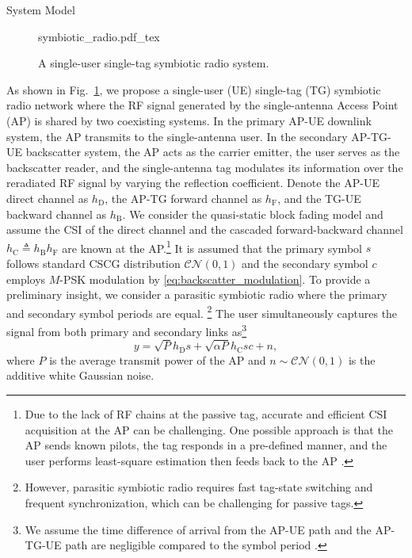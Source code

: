 \documentclass[journal]{IEEEtran}
\begin{document}
	\begin{section}{System Model}
		\begin{figure}[!t]
			\centering
			\def\svgwidth{0.9\columnwidth}
			{symbiotic_radio.pdf_tex}
			\caption{A single-user single-tag symbiotic radio system.}
			\label{fi:symbiotic_radio}
		\end{figure}
		As shown in Fig.~\ref{fi:symbiotic_radio}, we propose a single-user (UE) single-tag (TG) symbiotic radio network where the RF signal generated by the single-antenna Access Point (AP) is shared by two coexisting systems. In the primary AP-UE downlink system, the AP transmits to the single-antenna user. In the secondary AP-TG-UE backscatter system, the AP acts as the carrier emitter, the user serves as the backscatter reader, and the single-antenna tag modulates its information over the reradiated RF signal by varying the reflection coefficient. Denote the AP-UE direct channel as $h_{\mathrm{D}}$, the AP-TG forward channel as $h_{\mathrm{F}}$, and the TG-UE backward channel as $h_{\mathrm{B}}$. We consider the quasi-static block fading model and assume the CSI of the direct channel and the cascaded forward-backward channel $h_{\mathrm{C}} \triangleq h_{\mathrm{B}} h_{\mathrm{F}}$ are known at the AP.\footnote{Due to the lack of RF chains at the passive tag, accurate and efficient CSI acquisition at the AP can be challenging. One possible approach is that the AP sends known pilots, the tag responds in a pre-defined manner, and the user performs least-square estimation then feeds back to the AP \cite{Bharadia2015,Yang2015b,Guo2019e}.} It is assumed that the primary symbol $s$ follows standard CSCG distribution $\mathcal{CN}(0,1)$ and the secondary symbol $c$ employs $M$-PSK modulation by \eqref{eq:backscatter_modulation}. To provide a preliminary insight, we consider a parasitic symbiotic radio \cite{Long2020a} where the primary and secondary symbol periods are equal. \footnote{However, parasitic symbiotic radio requires fast tag-state switching and frequent synchronization, which can be challenging for passive tags.} The user simultaneously captures the signal from both primary and secondary links as\footnote{We assume the time difference of arrival from the AP-UE path and the AP-TG-UE path are negligible compared to the symbol period \cite{Guo2019b,Liang2020,Long2020a}.}
		\begin{equation}
			y = \sqrt{P} h_{\mathrm{D}} s + \sqrt{\alpha P} h_{\mathrm{C}} s c + n,
		\end{equation}
		where $P$ is the average transmit power of the AP and $n \sim \mathcal{CN}(0,1)$ is the additive white Gaussian noise.


\end{section}
\end{document}
